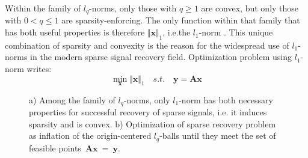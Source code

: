 \documentclass[journal]{IEEEtran}
\begin{document}
Within the family of $l_q$-norms, only those with $q\geq 1$ are convex, but only those with $0<q\leq 1$ are sparsity-enforcing. The only function within that family that has both useful properties is therefore $\Vert \boldsymbol{x}\Vert_1$, i.e.the $l_1$-norm \cite{Rish2015}. This unique combination of sparsity and convexity is the reason for the widespread use of $l_1$-norms in the modern sparse signal recovery field. Optimization problem using $l_1$-norm writes:
\begin{equation} \label{eq:l1_optimization}
	\min\limits_{\boldsymbol{x}}\Vert \boldsymbol{x}\Vert_1 \quad s.t. \quad \boldsymbol{y}=\boldsymbol{A} \boldsymbol{x}
\end{equation}
%
%
\begin{figure}
	\centering
	
	\caption{a) Among the family of $l_q$-norms, only $l_1$-norm has both necessary properties for successful recovery of sparse signals, i.e. it induces sparsity and is convex. b) Optimization of sparse recovery problem as inflation of the origin-centered $l_q$-balls until they meet the set of feasible points~$\boldsymbol{A}\boldsymbol{x}~=~\boldsymbol{y}$.~\cite{Rish2015}}
	\label{fig:lq_balls}
	
\end{figure}
\end{document}

